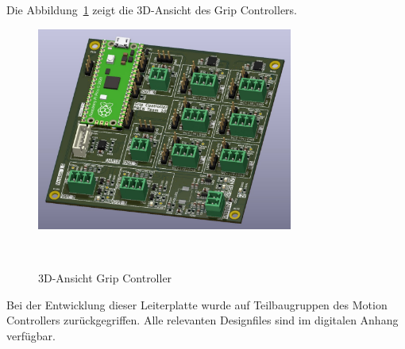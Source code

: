 \documentclass[main.tex]{subfiles} %
\begin{document}
Die Abbildung~\ref{fig:GripController_3D} zeigt die 3D-Ansicht des Grip
Controllers.

\begin{figure}[H]
      \centering
      \includegraphics[width=0.75\textwidth]{./fig_GripController/GripController_3D.pdf}
      \caption{3D-Ansicht Grip Controller}~\label{fig:GripController_3D}
\end{figure}

Bei der Entwicklung dieser Leiterplatte wurde auf Teilbaugruppen des Motion
Controllers zurückgegriffen. Alle relevanten Designfiles sind im digitalen
Anhang verfügbar.
\end{document}
